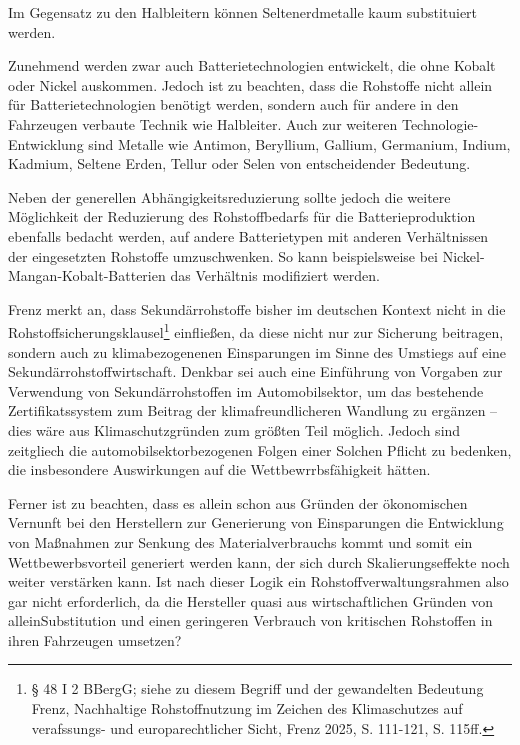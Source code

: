 \documentclass[12pt,a4paper,oneside]{book} %
\begin{document}
{Im Gegensatz zu den Halbleitern können Seltenerdmetalle kaum substituiert werden.

Zunehmend werden zwar auch Batterietechnologien entwickelt, die ohne Kobalt oder Nickel auskommen. Jedoch ist zu beachten, dass die Rohstoffe nicht allein für Batterietechnologien benötigt werden, sondern auch für andere in den Fahrzeugen verbaute Technik wie Halbleiter. Auch zur weiteren Technologie-Entwicklung sind Metalle wie Antimon, Beryllium, Gallium, Germanium, Indium, Kadmium, Seltene Erden, Tellur oder Selen von entscheidender Bedeutung.\autocite{Commodity Top News 73, S. 3}

Neben der generellen Abhängigkeitsreduzierung sollte jedoch die weitere Möglichkeit der Reduzierung des Rohstoffbedarfs für die Batterieproduktion ebenfalls bedacht werden, auf andere Batterietypen mit anderen Verhältnissen der eingesetzten Rohstoffe umzuschwenken. So kann beispielsweise bei Nickel-Mangan-Kobalt-Batterien das Verhältnis modifiziert werden.

Frenz merkt an, dass Sekundärrohstoffe bisher im deutschen Kontext nicht in die Rohstoffsicherungsklausel\footnote{§ 48 I 2 BBergG; siehe zu diesem Begriff und der gewandelten Bedeutung Frenz, Nachhaltige Rohstoffnutzung im Zeichen des Klimaschutzes auf verafssungs- und europarechtlicher Sicht, Frenz 2025, S. 111-121, S. 115ff. } einfließen, da diese nicht nur zur Sicherung beitragen, sondern auch zu klimabezogenenen Einsparungen im Sinne des Umstiegs auf eine Sekundärrohstoffwirtschaft.\autocite{Frenz 2025, S. 118} Denkbar sei auch eine Einführung von Vorgaben zur Verwendung von Sekundärrohstoffen im Automobilsektor, um das bestehende Zertifikatssystem zum Beitrag der klimafreundlicheren Wandlung zu ergänzen --  dies wäre aus Klimaschutzgründen zum größten Teil möglich. Jedoch sind zeitgliech die automobilsektorbezogenen Folgen einer Solchen Pflicht zu bedenken, die insbesondere Auswirkungen auf die Wettbewrrbsfähigkeit hätten.\autocite{Frenz 2025, S. 119}

Ferner ist zu beachten, dass es allein schon aus Gründen der ökonomischen Vernunft bei den Herstellern zur Generierung von Einsparungen die Entwicklung von Maßnahmen zur Senkung des Materialverbrauchs kommt und somit ein Wettbewerbsvorteil generiert werden kann, der sich durch Skalierungseffekte noch weiter verstärken kann.\autocite{Frenz 2025, S. 1097} Ist nach dieser Logik ein Rohstoffverwaltungsrahmen also gar nicht erforderlich, da die Hersteller quasi aus wirtschaftlichen Gründen \glqq von allein\grqq Substitution und einen geringeren Verbrauch von kritischen Rohstoffen in ihren Fahrzeugen umsetzen?

}
\end{document}
